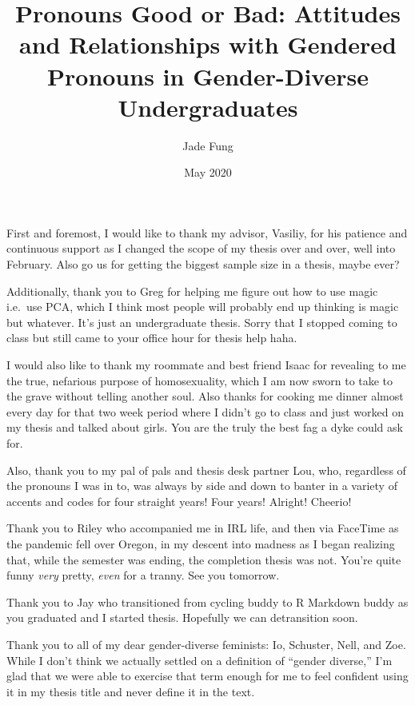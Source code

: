 \documentclass[12pt,twoside]{reedthesis}
\title{Pronouns Good or Bad: Attitudes and Relationships with Gendered Pronouns in Gender-Diverse Undergraduates}
\author{Jade Fung}
\date{May 2020}
\begin{document}
  \maketitle

\frontmatter %
\pagestyle{empty} %
  \begin{acknowledgements}
    First and foremost, I would like to thank my advisor, Vasiliy, for his patience and continuous support as I changed the scope of my thesis over and over, well into February. Also go us for getting the biggest sample size in a thesis, maybe ever?

    Additionally, thank you to Greg for helping me figure out how to use magic i.e.~use PCA, which I think most people will probably end up thinking is magic but whatever. It's just an undergraduate thesis. Sorry that I stopped coming to class but still came to your office hour for thesis help haha.

    I would also like to thank my roommate and best friend Isaac for revealing to me the true, nefarious purpose of homosexuality, which I am now sworn to take to the grave without telling another soul. Also thanks for cooking me dinner almost every day for that two week period where I didn't go to class and just worked on my thesis and talked about girls. You are the truly the best fag a dyke could ask for.

    Also, thank you to my pal of pals and thesis desk partner Lou, who, regardless of the pronouns I was in to, was always by side and down to banter in a variety of accents and codes for four straight years! Four years! Alright! Cheerio!

    Thank you to Riley who accompanied me in IRL life, and then via FaceTime as the pandemic fell over Oregon, in my descent into madness as I began realizing that, while the semester was ending, the completion thesis was not. You're quite funny \emph{very} pretty, \emph{even} for a tranny. See you tomorrow.

    Thank you to Jay who transitioned from cycling buddy to R Markdown buddy as you graduated and I started thesis. Hopefully we can detransition soon.

    Thank you to all of my dear gender-diverse feminists: Io, Schuster, Nell, and Zoe. While I don't think we actually settled on a definition of ``gender diverse,'' I'm glad that we were able to exercise that term enough for me to feel confident using it in my thesis title and never define it in the text.


\end{acknowledgements}
\end{document}

